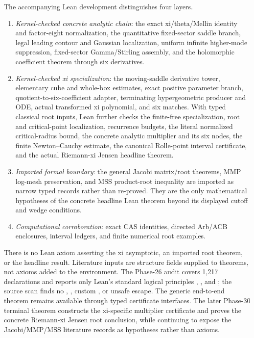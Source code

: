 \documentclass[12pt]{article}
\begin{document}
The accompanying Lean development distinguishes four layers.
\begin{enumerate}
\item \emph{Kernel-checked concrete analytic chain}: the exact
xi/theta/Mellin identity and factor-eight normalization, the quantitative
fixed-sector saddle branch, legal leading contour and Gaussian localization,
uniform infinite higher-mode suppression, fixed-sector Gamma/Stirling
assembly, and the holomorphic coefficient theorem through six derivatives.
\item \emph{Kernel-checked xi specialization}: the moving-saddle derivative
tower, elementary cube and whole-box estimates, exact positive parameter
branch, quotient-to-six-coefficient adapter, terminating hypergeometric
producer and ODE, actual transformed xi polynomial, and six matches.  With
typed classical root inputs, Lean further checks the finite-free
specialization, root and critical-point localization, recurrence budgets,
the literal normalized critical-radius bound, the concrete analytic
multiplier and its six nodes, the finite Newton--Cauchy estimate, the
canonical Rolle-point interval certificate, and the actual Riemann-xi Jensen
headline theorem.
\item \emph{Imported formal boundary}: the general Jacobi matrix/root
theorems, MMP log-mesh preservation, and MSS product-root inequality are
imported as narrow typed records rather than re-proved.  They are the only
mathematical hypotheses of the concrete headline Lean theorem beyond its
displayed cutoff and wedge conditions.
\item \emph{Computational corroboration}: exact CAS identities, directed
Arb/ACB enclosures, interval ledgers, and finite numerical root examples.
\end{enumerate}

There is no Lean axiom asserting the xi asymptotic, an imported root theorem,
or the headline result.  Literature inputs are structure fields supplied to
theorems, not axioms added to the environment.  The Phase-26 audit covers
1,217 declarations and reports only Lean's standard logical principles
, , and ; the source
scan finds no , , custom , or unsafe
escape.  The generic end-to-end theorem remains available through typed
certificate interfaces.  The later Phase-30 terminal theorem constructs the
xi-specific multiplier certificate and proves the concrete Riemann-xi Jensen
root conclusion, while continuing to expose the Jacobi/MMP/MSS literature
records as hypotheses rather than axioms.
\end{document}
